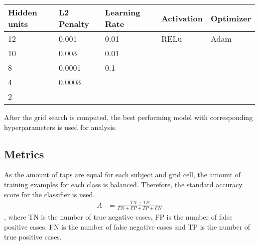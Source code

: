 \begin{center}
  \begin{tabular}{ | l | l | l | l | l |}
  \hline
  Hidden units & L2 Penalty & Learning Rate & Activation & Optimizer \\ \hline
  12 & 0.001 & 0.01 & RELu & Adam \cite{DBLP:journals/corr/KingmaB14} \\
  10 & 0.003 & 0.01 & & \\
  8 & 0.0001 & 0.1 & & \\
  4 & 0.0003 & & & \\
  2 & & & & \\
  \hline
  \end{tabular}
  \label{table:anns}
\end{center}

After the grid search is computed, the best performing model with corresponding hyperparameters is used for analysis.
\subsection{Metrics}
As the amount of taps are equal for each subject and grid cell, the amount of training examples for each class is balanced. Therefore, the standard accuracy score for the classifier is used.
\begin{align}
  A &= \frac{TN + TP}{TN + FP + TP + FN} 
\end{align},
where TN is the number of true negative cases, FP is the number of false positive cases, FN is the number of false negative cases and TP is the number of true positive cases.
\raggedbottom






